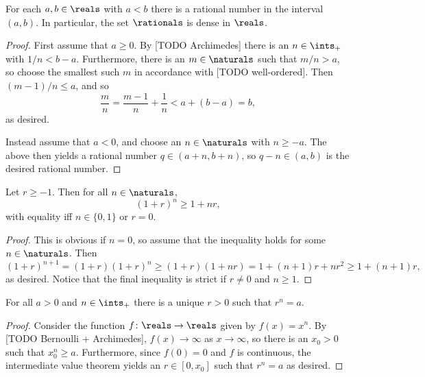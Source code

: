 \documentclass[article, a4paper, 11pt, oneside]{memoir}
\numberwithin{equation}{chapter}
\newcommand{\posints}{\ints_{+}}
\begin{document}
\begin{corollary}
    For each $a,b \in \reals$ with $a < b$ there is a rational number in the interval $(a,b)$. In particular, the set $\rationals$ is dense in $\reals$.
\end{corollary}

\begin{proof}
    First assume that $a \geq 0$. By [TODO Archimedes] there is an $n \in \posints$ with $1/n < b-a$. Furthermore, there is an $m \in \naturals$ such that $m/n > a$, so choose the smallest such $m$ in accordance with [TODO well-ordered]. Then $(m-1)/n \leq a$, and so
    \begin{equation*}
        \frac{m}{n}
            = \frac{m-1}{n} + \frac{1}{n}
            < a + (b-a)
            = b,
    \end{equation*}
    as desired.

    Instead assume that $a < 0$, and choose an $n \in \naturals$ with $n \geq -a$. The above then yields a rational number $q \in (a+n,b+n)$, so $q-n \in (a,b)$ is the desired rational number.
\end{proof}


\begin{lemma}
    Let $r \geq -1$. Then for all $n \in \naturals$,
    \begin{equation*}
        (1+r)^n \geq 1 + nr,
    \end{equation*}
    with equality iff $n \in \{0,1\}$ or $r = 0$.
\end{lemma}

\begin{proof}
    This is obvious if $n = 0$, so assume that the inequality holds for some $n \in \naturals$. Then
    \begin{equation*}
        (1+r)^{n+1}
            = (1+r)(1+r)^n
            \geq (1+r)(1+nr)
            = 1 + (n+1)r + nr^2
            \geq 1 + (n+1)r,
    \end{equation*}
    as desired. Notice that the final inequality is strict if $r \neq 0$ and $n \geq 1$.
\end{proof}


\begin{theorem}
    For all $a > 0$ and $n \in \posints$ there is a unique $r > 0$ such that $r^n = a$.
\end{theorem}

\begin{proof}
    Consider the function $f \colon \reals \to \reals$ given by $f(x) = x^n$. By [TODO Bernoulli + Archimedes], $f(x) \to \infty$ as $x \to \infty$, so there is an $x_0 > 0$ such that $x_0^n \geq a$. Furthermore, since $f(0) = 0$ and $f$ is continuous, the intermediate value theorem yields an $r \in [0,x_0]$ such that $r^n = a$ as desired.
\end{proof}
\end{document}
